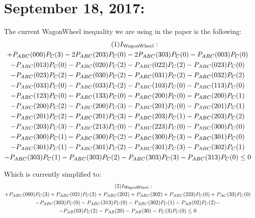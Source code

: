 \documentclass[aps, 10pt, english, twoside, pra, nofootinbib, tightenlines, longbibliography, superscriptaddress]{revtex4-1}
\begin{document}
    \section{September 18, 2017:}
    The current WagonWheel inequality we are using in the paper is the following:
    \begin{equation*}
    \begin{gathered}
        \eq
        I\tsb{WagonWheel} : \\
        + P_{ABC}(000)P_{C}(3) - 2P_{ABC}(203)P_{C}(0) - 2P_{ABC}(303)P_{C}(0) - P_{ABC}(003)P_{C}(0) \\
        - P_{ABC}(013)P_{C}(0) - P_{ABC}(020)P_{C}(2) - P_{ABC}(022)P_{C}(2) - P_{ABC}(023)P_{C}(0) \\
        - P_{ABC}(023)P_{C}(2) - P_{ABC}(030)P_{C}(2) - P_{ABC}(031)P_{C}(2) - P_{ABC}(032)P_{C}(2) \\
        - P_{ABC}(033)P_{C}(0) - P_{ABC}(033)P_{C}(2) - P_{ABC}(103)P_{C}(0) - P_{ABC}(113)P_{C}(0) \\
        - P_{ABC}(123)P_{C}(0) - P_{ABC}(133)P_{C}(0) - P_{ABC}(200)P_{C}(0) - P_{ABC}(200)P_{C}(1) \\
        - P_{ABC}(200)P_{C}(2) - P_{ABC}(200)P_{C}(3) - P_{ABC}(201)P_{C}(0) - P_{ABC}(201)P_{C}(1) \\
        - P_{ABC}(201)P_{C}(2) - P_{ABC}(201)P_{C}(3) - P_{ABC}(203)P_{C}(1) - P_{ABC}(203)P_{C}(2) \\
        - P_{ABC}(203)P_{C}(3) - P_{ABC}(213)P_{C}(0) - P_{ABC}(223)P_{C}(0) - P_{ABC}(300)P_{C}(0) \\
        - P_{ABC}(300)P_{C}(1) - P_{ABC}(300)P_{C}(2) - P_{ABC}(300)P_{C}(3) - P_{ABC}(301)P_{C}(0) \\
        - P_{ABC}(301)P_{C}(1) - P_{ABC}(301)P_{C}(2) - P_{ABC}(301)P_{C}(3) - P_{ABC}(302)P_{C}(1) \\
        - P_{ABC}(303)P_{C}(1) - P_{ABC}(303)P_{C}(2) - P_{ABC}(303)P_{C}(3) - P_{ABC}(313)P_{C}(0) \leq 0
    \end{gathered}
    \end{equation*}

    Which is currently simplified to:
    \begin{equation*}
    \begin{gathered}
    \eq
    I\tsb{WagonWheel} : \\
    + P_{ABC}(000)P_{C}(3) + P_{ABC}(021)P_{C}(2) + P_{ABC}(202) + P_{ABC}(302) + P_{ABC}(233)P_{C}(0) + P_{AC}(33)P_{C}(0) \\
    - P_{ABC}(303)P_{C}(0) - P_{ABC}(313)P_{C}(0) - P_{ABC}(302)P_{C}(1) - P_{AB}(02)P_{C}(2) - \\
    - P_{AB}(03)P_{C}(2) - P_{AB}(20) - P_{AB}(30) - P_{C}(3)P_{C}(0) \leq 0
    \end{gathered}
    \end{equation*}
\end{document}
